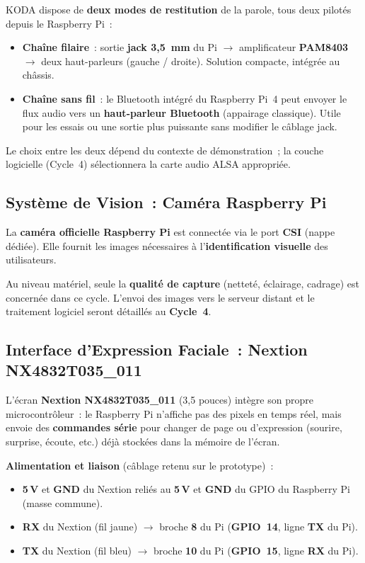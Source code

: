 \documentclass[a4paper,12pt]{report}
\begin{document}
	KODA dispose de \textbf{deux modes de restitution} de la parole, tous deux
	pilotés depuis le Raspberry Pi~:
	
	\begin{itemize}
		\item \textbf{Chaîne filaire}~: sortie \textbf{jack 3{,}5~mm} du Pi
		$\rightarrow$ amplificateur \textbf{PAM8403} $\rightarrow$ deux
		haut-parleurs (gauche / droite). Solution compacte, intégrée au châssis.
		\item \textbf{Chaîne sans fil}~: le Bluetooth intégré du Raspberry Pi~4
		peut envoyer le flux audio vers un \textbf{haut-parleur Bluetooth}
		(appairage classique). Utile pour les essais ou une sortie plus puissante
		sans modifier le câblage jack.
	\end{itemize}
	
	Le choix entre les deux dépend du contexte de démonstration~; la couche
	logicielle (Cycle~4) sélectionnera la carte audio ALSA appropriée.
	
	\subsection{Système de Vision~: Caméra Raspberry Pi}
	
	La \textbf{caméra officielle Raspberry Pi} est connectée via le port
	\textbf{CSI} (nappe dédiée). Elle fournit les images nécessaires à
	l'\textbf{identification visuelle} des utilisateurs.
	
	Au niveau matériel, seule la \textbf{qualité de capture} (netteté,
	éclairage, cadrage) est concernée dans ce cycle. L'envoi des images vers
	le serveur distant et le traitement logiciel seront détaillés au
	\textbf{Cycle~4}.
	
	\subsection{Interface d'Expression Faciale~: Nextion NX4832T035\_011}
	
	L'écran \textbf{Nextion NX4832T035\_011} (3{,}5 pouces) intègre son propre
	microcontrôleur~: le Raspberry Pi n'affiche pas des pixels en temps réel,
	mais envoie des \textbf{commandes série} pour changer de page ou d'expression
	(sourire, surprise, écoute, etc.) déjà stockées dans la mémoire de l'écran.
	
	\textbf{Alimentation et liaison} (câblage retenu sur le prototype)~:
	\begin{itemize}
		\item \textbf{5\,V} et \textbf{GND} du Nextion reliés au \textbf{5\,V}
		et \textbf{GND} du GPIO du Raspberry Pi (masse commune).
		\item \textbf{RX} du Nextion (fil jaune) $\rightarrow$ broche \textbf{8}
		du Pi (\textbf{GPIO~14}, ligne \textbf{TX} du Pi).
		\item \textbf{TX} du Nextion (fil bleu) $\rightarrow$ broche \textbf{10}
		du Pi (\textbf{GPIO~15}, ligne \textbf{RX} du Pi).
	\end{itemize}
	
\end{document}
